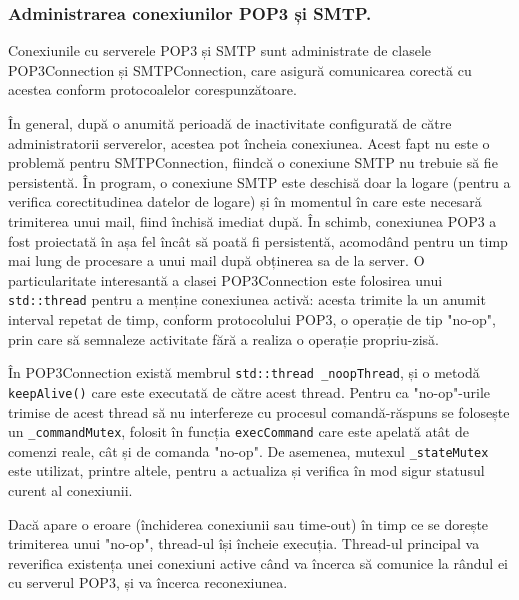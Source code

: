 \documentclass[runningheads]{llncs}
\begin{document}
\subsubsection{Administrarea conexiunilor POP3 și SMTP.}

Conexiunile cu serverele POP3 și SMTP sunt administrate de clasele POP3Connection și SMTPConnection, care asigură comunicarea corectă cu acestea conform protocoalelor corespunzătoare. 

În general, după o anumită perioadă de inactivitate configurată de către administratorii serverelor, acestea pot încheia conexiunea. Acest fapt nu este o problemă pentru SMTPConnection, fiindcă o conexiune SMTP nu trebuie să fie persistentă. În program, o conexiune SMTP este deschisă doar la logare (pentru a verifica corectitudinea datelor de logare) și în momentul în care este necesară trimiterea unui mail, fiind închisă imediat după. În schimb, conexiunea POP3 a fost proiectată în așa fel încât să poată fi persistentă, acomodând pentru un timp mai lung de procesare a unui mail după obținerea sa de la server. O particularitate interesantă a clasei POP3Connection este folosirea unui \texttt{std::thread} pentru a menține conexiunea activă: acesta trimite la un anumit interval repetat de timp, conform protocolului POP3, o operație de tip "no-op", prin care să semnaleze activitate fără a realiza o operație propriu-zisă.

În POP3Connection există membrul \texttt{std::thread \_noopThread}, și o metodă \texttt{keepAlive()} care este executată de către acest thread. Pentru ca "no-op"-urile trimise de acest thread să nu interfereze cu procesul comandă-răspuns se folosește un \texttt{\_commandMutex}, folosit în funcția \texttt{execCommand} care este apelată atât de comenzi reale, cât și de comanda "no-op". De asemenea, mutexul \texttt{\_stateMutex} este utilizat, printre altele, pentru a actualiza și verifica în mod sigur statusul curent al conexiunii.

Dacă apare o eroare (închiderea conexiunii sau time-out) în timp ce se dorește trimiterea unui "no-op", thread-ul își încheie execuția. Thread-ul principal va reverifica existența unei conexiuni active când va încerca să comunice la rândul ei cu serverul POP3, și va încerca reconexiunea.
\end{document}
